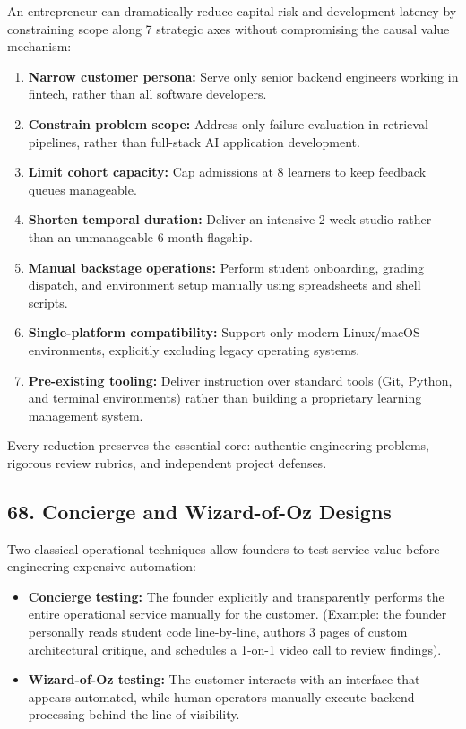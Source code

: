 An entrepreneur can dramatically reduce capital risk and development latency by constraining scope along 7 strategic axes without compromising the causal value mechanism:
\begin{enumerate}
    \item \textbf{Narrow customer persona:} Serve only senior backend engineers working in fintech, rather than all software developers.
    \item \textbf{Constrain problem scope:} Address only failure evaluation in retrieval pipelines, rather than full-stack AI application development.
    \item \textbf{Limit cohort capacity:} Cap admissions at 8 learners to keep feedback queues manageable.
    \item \textbf{Shorten temporal duration:} Deliver an intensive 2-week studio rather than an unmanageable 6-month flagship.
    \item \textbf{Manual backstage operations:} Perform student onboarding, grading dispatch, and environment setup manually using spreadsheets and shell scripts.
    \item \textbf{Single-platform compatibility:} Support only modern Linux/macOS environments, explicitly excluding legacy operating systems.
    \item \textbf{Pre-existing tooling:} Deliver instruction over standard tools (Git, Python, and terminal environments) rather than building a proprietary learning management system.
\end{enumerate}

Every reduction preserves the essential core: authentic engineering problems, rigorous review rubrics, and independent project defenses.

\subsection*{68. Concierge and Wizard-of-Oz Designs}

Two classical operational techniques allow founders to test service value before engineering expensive automation:
\begin{itemize}
    \item \textbf{Concierge testing:} The founder explicitly and transparently performs the entire operational service manually for the customer. (Example: the founder personally reads student code line-by-line, authors 3 pages of custom architectural critique, and schedules a 1-on-1 video call to review findings).
    \item \textbf{Wizard-of-Oz testing:} The customer interacts with an interface that appears automated, while human operators manually execute backend processing behind the line of visibility.
\end{itemize}

